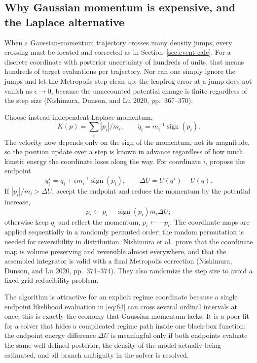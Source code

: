 \documentclass[11pt]{article}
\begin{document}
\subsection{Why Gaussian momentum is expensive, and the Laplace alternative}\label{sec:dhmc-laplace}

When a Gaussian-momentum trajectory crosses many density jumps, every
crossing must be located and corrected as in Section~\ref{sec:event-calc}.
For a discrete coordinate with posterior uncertainty of hundreds of units,
that means hundreds of target evaluations per trajectory. Nor can one simply
ignore the jumps and let the Metropolis step clean up: the leapfrog error at
a jump does not vanish as $\epsilon\to0$, because the unaccounted potential
change is finite regardless of the step size (Nishimura, Dunson, and Lu 2020,
pp.~367--370).

Choose instead independent Laplace momentum,
\begin{equation}\label{eq:63}
 K(p)=\sum_i |p_i|/m_i,
\qquad
 \dot q_i=m_i^{-1}\operatorname{sign}(p_i).
\end{equation}
The velocity now depends only on the sign of the momentum, not its
magnitude, so the position update over a step is known in advance regardless
of how much kinetic energy the coordinate loses along the way. For
coordinate $i$, propose the endpoint
\begin{equation}\label{eq:64}
 q_i^\star=q_i+\epsilon m_i^{-1}\operatorname{sign}(p_i),
\qquad
 \Delta U=U(q^\star)-U(q).
\end{equation}
If $|p_i|/m_i>\Delta U$, accept the endpoint and reduce the momentum by the
potential increase,
\begin{equation}\label{eq:65}
 p_i\leftarrow p_i-\operatorname{sign}(p_i)m_i\Delta U;
\end{equation}
otherwise keep $q_i$ and reflect the momentum, $p_i\leftarrow-p_i$. The
coordinate maps are applied sequentially in a randomly permuted order; the
random permutation is needed for reversibility in distribution. Nishimura
et al.\ prove that the coordinate map is volume preserving and reversible
almost everywhere, and that the assembled integrator is valid with a final
Metropolis correction (Nishimura, Dunson, and Lu 2020, pp.~371--374). They
also randomize the step size to avoid a fixed-grid reducibility problem.

The algorithm is attractive for an explicit regime coordinate because a
single endpoint likelihood evaluation in \eqref{eq:64} can cross several
ordinal intervals at once; this is exactly the economy that Gaussian
momentum lacks. It is a poor fit for a solver that hides a complicated
regime path inside one black-box function: the endpoint energy difference
$\Delta U$ is meaningful only if both endpoints evaluate the same
well-defined posterior, the density of the model actually being
estimated, and all branch ambiguity in the solver is resolved.
\end{document}
